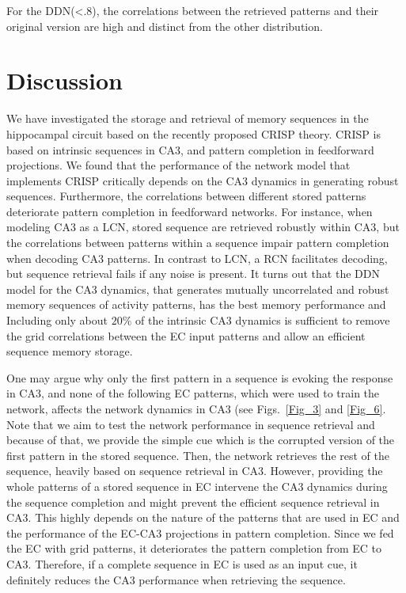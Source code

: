 \documentclass[utf8]{frontiersSCNS} %
\begin{document}
For the DDN(<.8), the correlations between the retrieved patterns and their original version are high and distinct from the other distribution.     

\section{Discussion}

We have investigated the storage and retrieval of memory sequences in the hippocampal circuit based on the recently proposed CRISP theory. CRISP is based on intrinsic sequences in CA3, and pattern completion in feedforward projections. We found that the performance of the network model that implements CRISP critically depends on the CA3 dynamics in generating robust sequences. Furthermore, the correlations between different stored patterns deteriorate pattern completion in feedforward networks. For instance, when modeling CA3 as a LCN, stored sequence are retrieved robustly within CA3, but the correlations between patterns within a sequence impair pattern completion when decoding CA3 patterns. In contrast to LCN, a RCN facilitates decoding, but sequence retrieval fails if any noise is present.
%
It turns out that the DDN model for the CA3 dynamics, that generates mutually uncorrelated and robust memory sequences of activity patterns, has the best memory performance and 
%
Including only about $20\%$ of the intrinsic CA3 dynamics is sufficient to remove the grid correlations between the EC input patterns and allow an efficient sequence memory storage.   
%

One may argue why only the first pattern in a sequence is evoking the response in CA3, and none of the following EC patterns, which were used to train the network, affects the network dynamics in CA3 (see Figs.~\ref{Fig_3} and \ref{Fig_6}.  
Note that we aim to test the network performance in sequence retrieval and because of that, we provide the simple cue which is the corrupted version of the first pattern in the stored sequence. Then, the network retrieves the rest of the sequence, heavily based on sequence retrieval in CA3. 
However, providing the whole patterns of a stored sequence in EC intervene the CA3 dynamics during the sequence completion and might prevent the efficient sequence retrieval in CA3. This highly depends on the nature of the patterns that are used in EC and the performance of the EC-CA3 projections in pattern completion. Since we fed the EC with grid patterns, it deteriorates the pattern completion from EC to CA3. Therefore, if a complete sequence in EC is used as an input cue, it definitely reduces the CA3 performance when retrieving the sequence.
\end{document}
